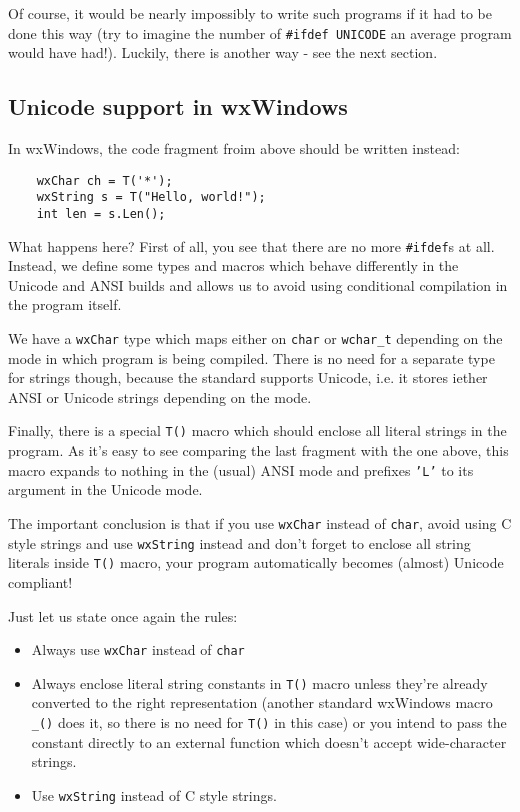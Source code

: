 Of course, it would be nearly impossibly to write such programs if it had to
be done this way (try to imagine the number of {\tt #ifdef UNICODE} an average
program would have had!). Luckily, there is another way - see the next
section.

\subsection{Unicode support in wxWindows}

In wxWindows, the code fragment froim above should be written instead:

\begin{verbatim}
    wxChar ch = T('*');
    wxString s = T("Hello, world!");
    int len = s.Len();
\end{verbatim}

What happens here? First of all, you see that there are no more {\tt #ifdef}s
at all. Instead, we define some types and macros which behave differently in
the Unicode and ANSI builds and allows us to avoid using conditional
compilation in the program itself.

We have a {\tt wxChar} type which maps either on {\tt char} or {\tt wchar\_t} 
depending on the mode in which program is being compiled. There is no need for
a separate type for strings though, because the standard 
 supports Unicode, i.e. it stores iether ANSI or
Unicode strings depending on the mode.

Finally, there is a special {\tt T()} macro which should enclose all literal
strings in the program. As it's easy to see comparing the last fragment with
the one above, this macro expands to nothing in the (usual) ANSI mode and
prefixes {\tt 'L'} to its argument in the Unicode mode.

The important conclusion is that if you use {\tt wxChar} instead of 
{\tt char}, avoid using C style strings and use {\tt wxString} instead and
don't forget to enclose all string literals inside {\tt T()} macro, your
program automatically becomes (almost) Unicode compliant!

Just let us state once again the rules:
\begin{itemize}
\item Always use {\tt wxChar} instead of {\tt char}
\item Always enclose literal string constants in {\tt T()} macro unless
they're already converted to the right representation (another standard
wxWindows macro {\tt \_()} does it, so there is no need for {\tt T()} in this
case) or you intend to pass the constant directly to an external function
which doesn't accept wide-character strings.
\item Use {\tt wxString} instead of C style strings.
\end{itemize}

